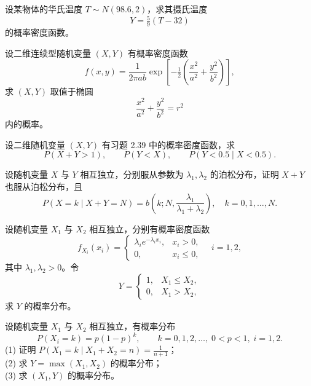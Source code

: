 \begin{homework}[2.45]
设某物体的华氏温度 $T \sim N(98.6, 2)$，求其摄氏温度
\[
Y = \tfrac{5}{9}(T - 32)
\]
的概率密度函数。
\end{homework}

\begin{homework}[2.50]
设二维连续型随机变量 $(X,Y)$ 有概率密度函数
\[
f(x,y) = \frac{1}{2\pi ab} \exp \!\left[ -\tfrac{1}{2} \!\left( \frac{x^2}{a^2} + \frac{y^2}{b^2} \right) \right],
\]
求 $(X,Y)$ 取值于椭圆
\[
\frac{x^2}{a^2} + \frac{y^2}{b^2} = r^2
\]
内的概率。
\end{homework}

\begin{homework}[2.53]
设二维随机变量 $(X,Y)$ 有习题 2.39 中的概率密度函数，求
\[
P(X+Y > 1),\qquad P(Y < X),\qquad P(Y < 0.5 \mid X < 0.5).
\]
\end{homework}

\begin{homework}[2.56]
设随机变量 $X$ 与 $Y$ 相互独立，分别服从参数为 $\lambda_1,\lambda_2$ 的泊松分布，证明 $X+Y$ 也服从泊松分布，且
\[
P(X = k \mid X+Y = N)
 = b\!\left(k;N,\frac{\lambda_1}{\lambda_1+\lambda_2}\right),
\quad k=0,1,\ldots,N.
\]
\end{homework}

\begin{homework}[2.52]
设随机变量 $X_1$ 与 $X_2$ 相互独立，分别有概率密度函数
\[
f_{X_i}(x_i)=
\begin{cases}
\lambda_i e^{-\lambda_i x_i}, & x_i > 0,\\[4pt]
0, & x_i \le 0,
\end{cases}
\quad i=1,2,
\]
其中 $\lambda_1,\lambda_2>0$。令
\[
Y =
\begin{cases}
1, & X_1 \le X_2,\\
0, & X_1 > X_2,
\end{cases}
\]
求 $Y$ 的概率分布。
\end{homework}

\begin{homework}[2.57]
设随机变量 $X_1$ 与 $X_2$ 相互独立，有概率分布
\[
P(X_i = k) = p(1-p)^k,\qquad k = 0,1,2,\ldots,\; 0<p<1,\; i=1,2.
\]
(1) 证明 $P(X_1=k \mid X_1+X_2=n)=\frac{1}{n+1}$；\\
(2) 求 $Y = \max(X_1,X_2)$ 的概率分布；\\
(3) 求 $(X_1,Y)$ 的概率分布。
\end{homework}

